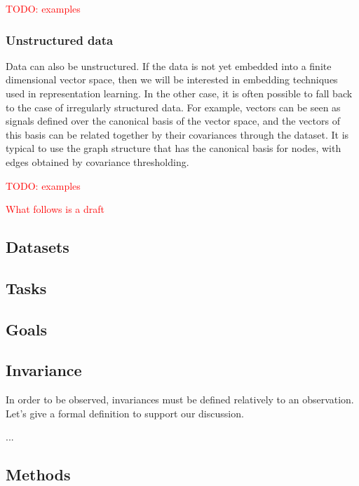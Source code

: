 \textcolor{red}{TODO: examples}

\subsubsection{Unstructured data}

Data can also be unstructured. If the data is not yet embedded into a finite dimensional vector space, then we will be interested in embedding techniques used in representation learning. In the other case, it is often possible to fall back to the case of irregularly structured data. For example, vectors can be seen as signals defined over the canonical basis of the vector space, and the vectors of this basis can be related together by their covariances through the dataset. It is typical to use the graph structure that has the canonical basis for nodes, with edges obtained by covariance thresholding.

\textcolor{red}{TODO: examples}


%
%
\textcolor{red}{What follows is a draft}




\subsection{Datasets}

\subsection{Tasks} %
\label{tasks}



\subsection{Goals}

\subsection{Invariance}

In order to be observed, invariances must be defined relatively to an observation. Let's give a formal definition to support our discussion.

...

\subsection{Methods}
\label{methods}